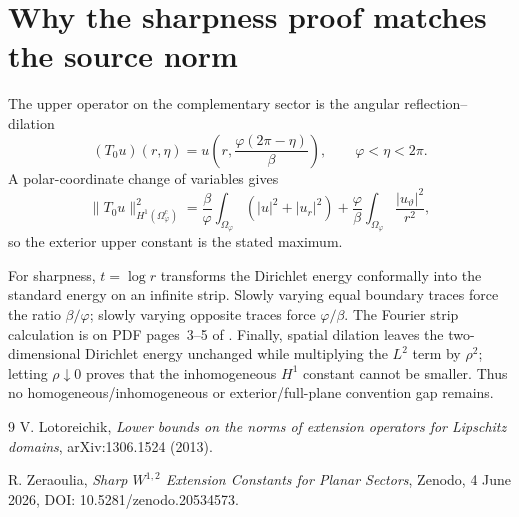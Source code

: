\documentclass[11pt]{article}
\begin{document}
\section*{Why the sharpness proof matches the source norm}

The upper operator on the complementary sector is the angular
reflection--dilation
\[
 (T_0u)(r,\eta)
 =u\!\left(r,\frac{\varphi(2\pi-\eta)}{\beta}\right),
 \qquad \varphi<\eta<2\pi.
\]
A polar-coordinate change of variables gives
\[
 \|T_0u\|_{H^1(\Omega_\varphi^c)}^2
 =\frac{\beta}{\varphi}
   \int_{\Omega_\varphi}(|u|^2+|u_r|^2)
 +\frac{\varphi}{\beta}
   \int_{\Omega_\varphi}\frac{|u_\vartheta|^2}{r^2},
\]
so the exterior upper constant is the stated maximum.

For sharpness, $t=\log r$ transforms the Dirichlet energy conformally into
the standard energy on an infinite strip.  Slowly varying equal boundary
traces force the ratio $\beta/\varphi$; slowly varying opposite traces force
$\varphi/\beta$.  The Fourier strip calculation is on PDF pages~3--5 of
\cite{Zer}.  Finally, spatial dilation leaves the two-dimensional Dirichlet
energy unchanged while multiplying the $L^2$ term by $\rho^2$; letting
$\rho\downarrow0$ proves that the inhomogeneous $H^1$ constant cannot be
smaller.  Thus no homogeneous/inhomogeneous or exterior/full-plane convention
gap remains.

\begin{thebibliography}{9}
V. Lotoreichik,
\emph{Lower bounds on the norms of extension operators for Lipschitz domains},
arXiv:1306.1524 (2013).

R. Zeraoulia,
\emph{Sharp $W^{1,2}$ Extension Constants for Planar Sectors},
Zenodo, 4 June 2026, DOI: 10.5281/zenodo.20534573.
\end{thebibliography}
\end{document}
